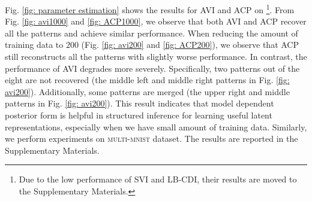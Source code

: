 Fig. \ref{fig: parameter estimation} shows the  results for AVI and ACP on \pattern \footnote{Due to the low performance of SVI and LB-CDI, their results are moved to the Supplementary Materials.}.
 From Fig. \ref{fig: avi1000} and \ref{fig: ACP1000}, we observe that both AVI and ACP recover all the patterns and achieve similar performance. When reducing the amount of training data to $200$ (Fig. \ref{fig: avi200} and \ref{fig: ACP200}), we observe that ACP still reconstructs all the patterns with slightly worse performance. In contrast, the performance of AVI degrades more severely. Specifically, two patterns out of the eight are not recovered (\ie the middle left and middle right patterns in Fig. \ref{fig: avi200}). Additionally, some patterns are merged (\ie the upper right and middle patterns in Fig. \ref{fig: avi200}). This result indicates that model dependent posterior form is helpful in structured inference for learning useful latent representations, especially when we have small amount of training data. Similarly, we perform experiments on \textsc{multi-mnist} dataset. The results are reported in the Supplementary Materials.  %








